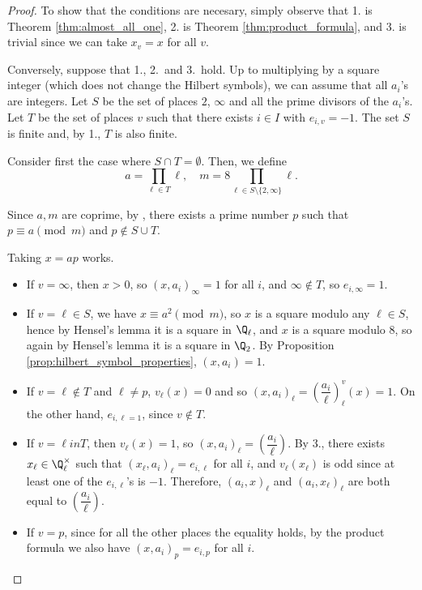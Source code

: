 \begin{proof}
To show that the conditions are necesary, simply observe that 1. is Theorem \ref{thm:almost_all_one},
2. is Theorem \ref{thm:product_formula}, and 3. is trivial since we can take $x_v = x$ for all $v$.

Conversely, suppose that 1., 2.\ and 3.\ hold. Up to multiplying by a square integer (which does
not change the Hilbert symbols), we can assume that all $a_i$'s are integers.
Let $S$ be the set of places $2$, $\infty$ and all the prime divisors of the $a_i$'s.
Let $T$ be the set of places $v$ such that there exists $i \in I$ with $e_{i,v}=-1$.
The set $S$ is finite and, by 1., $T$ is also finite.

Consider first the case where $S \cap T= \emptyset$. Then, we define
\[
a = \prod_{\ell \in T} \ell, \quad m = 8 \prod_{\ell \in S \setminus\{2,\infty\}} \ell.
\]

Since $a,m$ are coprime, by , there exists a prime number
$p$ such that $p \equiv a \pmod m$ and $p \not\in S \cup T$.

Taking $x=ap$ works.
\begin{itemize}
	\item If $v= \infty$, then $x > 0$, so $(x, a_i)_\infty = 1$ for all $i$, and $\infty \notin T$,
	so $e_{i,\infty}=1$.
	\item If $v = \ell \in S$, we have $x \equiv a^2 \pmod m$, so $x$ is a square modulo any $\ell \in S$,
	hence by Hensel's lemma it is a square in $\Q_\ell$, and $x$ is a square modulo $8$, so again by
	Hensel's lemma it is a square in $\Q_2$. By Proposition \ref{prop:hilbert_symbol_properties},
	$(x,a_i)=1$.
	\item If $v = \ell \notin T$ and $\ell \ne p$, $v_\ell(x)=0$ and so
	$(x,a_i)_{\ell}=\left(\dfrac{a_i}{\ell}\right)^v_{\ell}(x)=1$. On the other hand, $e_{i,\ell=1}$,
	since $v \notin T$.
	\item If $v = \ell in T$, then $v_\ell(x)=1$, so $(x,a_i)_{\ell}=\left(\dfrac{a_i}{\ell}\right)$.
  By 3., there exists $x_\ell \in \Q_\ell^\times$ such that $(x_\ell, a_i)_\ell = e_{i,\ell}$ for all $i$,
	and $v_\ell(x_\ell)$ is odd since at least one of the $e_{i,\ell}$'s is $-1$.
	Therefore, $(a_i,x)_\ell$ and $(a_i,x_\ell)_\ell$ are both equal to $\left(\dfrac{a_i}{\ell}\right)$.
	\item If $v = p$, since for all the other places the equality holds, by the product formula we
	also have $(x,a_i)_p = e_{i,p}$ for all $i$.
\end{itemize}


\end{proof}
